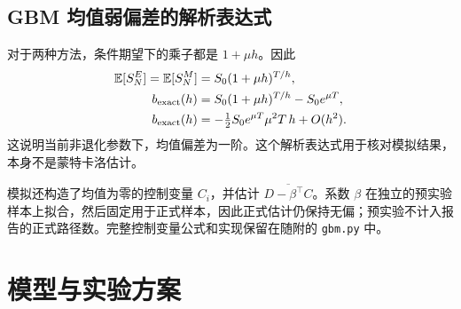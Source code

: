 \documentclass[11pt,a4paper,fontset=none]{ctexart}
\begin{document}
\subsection{GBM 均值弱偏差的解析表达式}
对于两种方法，条件期望下的乘子都是 $1+\mu h$。因此
\begin{align}
\mathbb E[S_N^{E}]=\mathbb E[S_N^{M}]&=S_0(1+\mu h)^{T/h},\\
b_{\rm exact}(h)&=S_0(1+\mu h)^{T/h}-S_0e^{\mu T},\label{eq:weak}\\
b_{\rm exact}(h)&=-\tfrac12 S_0e^{\mu T}\mu^2T\,h+O(h^2).
\end{align}
这说明当前非退化参数下，均值偏差为一阶。这个解析表达式用于核对模拟结果，本身不是蒙特卡洛估计。

模拟还构造了均值为零的控制变量 $C_i$，并估计 $\overline{D-\beta^\top C}$。系数 $\beta$ 在独立的预实验样本上拟合，然后固定用于正式样本，因此正式估计仍保持无偏；预实验不计入报告的正式路径数。完整控制变量公式和实现保留在随附的 \texttt{gbm.py} 中。

\newpage
\section{模型与实验方案}\label{sec:protocol}
\end{document}

